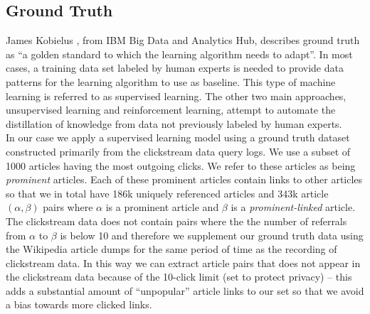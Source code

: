 \subsection{Ground Truth}

James Kobielus \cite{kobielus}, from IBM Big Data and Analytics Hub, describes ground truth as ``a golden standard to which the learning algorithm needs to adapt''. In most cases, a training data set labeled by human experts is needed to provide data patterns for the learning algorithm to use as baseline. This type of machine learning is referred to as supervised learning. The other two main approaches, unsupervised learning and reinforcement learning, attempt to automate the distillation of knowledge from data not previously labeled by human experts. \\

In our case we apply a supervised learning model using a ground truth dataset constructed primarily from the clickstream data query logs. We use a subset of 1000 articles having the most outgoing clicks. We refer to these articles as being \textit{prominent} articles. Each of these prominent articles contain links to other articles so that we in total have  186k uniquely referenced articles and 343k article $(\alpha,\beta)$ pairs where $\alpha$ is a prominent article and $\beta$ is a \textit{prominent-linked} article. \\

The clickstream data does not contain pairs where the the number of referrals from $\alpha$ to $\beta$ is below 10 and therefore we supplement our ground truth data using the Wikipedia article dumps for the same period of time as the recording of clickstream data. In this way we can extract article pairs that does not appear in the clickstream data because of the 10-click limit (set to protect privacy) -- this adds a substantial amount of ``unpopular'' article links to our set so that we avoid a bias towards more clicked links.  \\